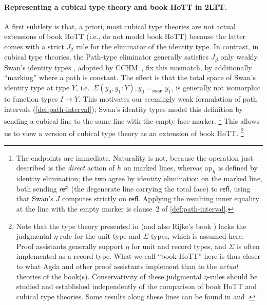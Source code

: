 \paragraph{Representing a cubical type theory and book HoTT in 2LTT\@.}
A first subtlety is that, a priori, most cubical type theories are not actual extensions of book HoTT (i.e., do not model book HoTT) because the latter comes with a strict $J_\beta$ rule for the eliminator of the identity type.
In contrast, in cubical type theories, the Path-type
eliminator generally satisfies $J_\beta$ only weakly.
Swan's identity types \citep{Swan2016}, adopted by CCHM~\citep[\S9.1]{CCHM2018}, fix this mismatch, by additionally ``marking'' where a path is constant.
The effect is that the total space of Swan's identity type at type $Y$, i.e.\ $\Sigma(y_0, y_1: Y), y_0 =_\mathsf{swan} y_1$, is generally not isomorphic to function types $I \to Y$.
This motivates our seemingly weak formulation of path intervals (\cref{def:path-interval}); Swan's identity types model this definition by sending a cubical line to the same line with the empty face marker.%
\footnote{The endpoints are immediate. Naturality is not, because the operation just described is the \emph{direct} action of $h$ on marked lines, whereas $\mathrm{ap}_h$ is defined by identity elimination; the two agree by identity elimination on the marked line, both sending $\mathsf{refl}$ (the degenerate line carrying the total face) to $\mathsf{refl}$, using that Swan's $J$ computes strictly on $\mathsf{refl}$. Applying the resulting inner equality at the line with the empty marker is clause~2 of \cref{def:path-interval}.}
This allows us to view a version of cubical type theory as an extension of book HoTT.%
\footnote{Note that the type theory presented in \cite{HoTTBook} (and also Rijke's book \cite{Rijke_2025}) lacks the judgmental $\eta$-rule for the unit type and $\Sigma$-types, which is assumed here. Proof assistants generally support $\eta$ for unit and record types, and $\Sigma$ is often implemented as a record type.
What we call ``book HoTT'' here is thus closer to what Agda and other proof assistants implement than to the \emph{actual} theories of the book(s). Conservativity of these judgmental $\eta$-rules should be studied and established independently of the comparison of book HoTT and cubical type theories. Some results along these lines can be found in \cite{Isaev2018Morita} and \cite{Bocquet2020,Bocquet2023}.}

\newcommand{\axUA}{\mathsf{(ua)}}
\newcommand{\axInt}{\mathsf{(int)}}
\newcommand{\axGlue}{\mathsf{(glue)}}


